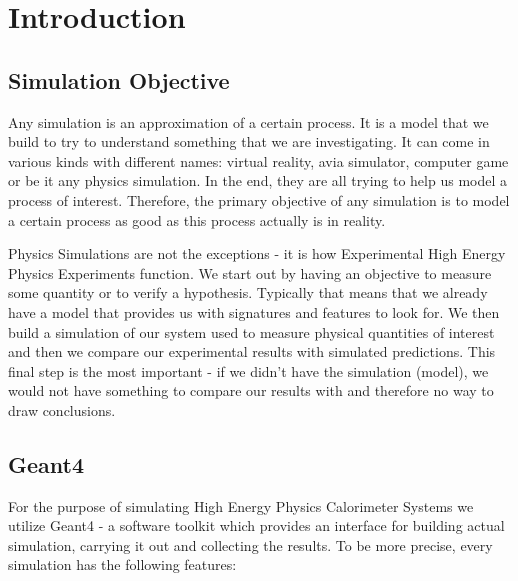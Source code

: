 \section{Introduction} \label{section:simulations_introduction}

\subsection{Simulation Objective} \label{subsection:simulations_introduction_objective}
Any simulation is an approximation of a certain process. It is a model that we build to try to understand something that we are investigating. It can come in various kinds with different names: virtual reality, avia simulator, computer game or be it any physics simulation. In the end, they are all trying to help us model a process of interest. Therefore, the primary objective of any simulation is to model a certain process as good as this process actually is in reality.

Physics Simulations are not the exceptions - it is how Experimental High Energy Physics Experiments function. We start out by having an objective to measure some quantity or to verify a hypothesis. Typically that means that we already have a model that provides us with signatures and features to look for. We then build a simulation of our system used to measure physical quantities of interest and then we compare our experimental results with simulated predictions. This final step is the most important - if we didn't have the simulation (model), we would not have something to compare our results with and therefore no way to draw conclusions.

\subsection{Geant4} \label{subsection:simulations_introduction_geant4}
For the purpose of simulating High Energy Physics Calorimeter Systems we utilize Geant4 - a software toolkit which provides an interface for building actual simulation, carrying it out and collecting the results. To be more precise, every simulation has the following features:

